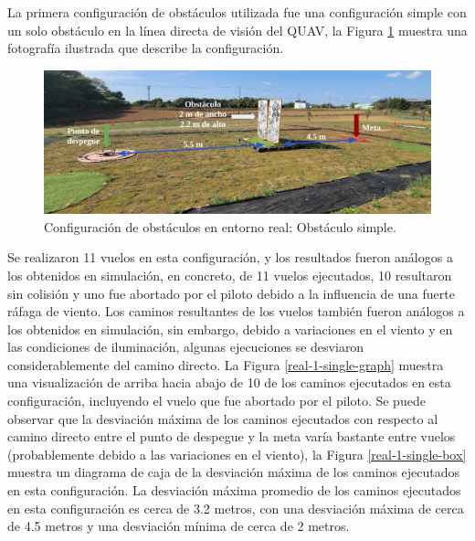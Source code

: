 La primera configuración de obstáculos utilizada fue una configuración simple con un solo obstáculo en la línea directa de visión del QUAV, la Figura \ref{real-1-single-0-setup} muestra una fotografía ilustrada que describe la configuración.

\begin{figure}[H]
    \centering
    \includegraphics[scale=0.22]{partes/img/real-1-single-0-setup.png}
    \caption[Configuración de obstáculos en entorno real: Obstáculo simple]{Configuración de obstáculos en entorno real: Obstáculo simple.}
    \label{real-1-single-0-setup}
\end{figure}

Se realizaron 11 vuelos en esta configuración, y los resultados fueron análogos a los obtenidos en simulación, en concreto, de 11 vuelos ejecutados, 10 resultaron sin colisión y uno fue abortado por el piloto debido a la influencia de una fuerte ráfaga de viento. Los caminos resultantes de los vuelos también fueron análogos a los obtenidos en simulación, sin embargo, debido a variaciones en el viento y en las condiciones de iluminación, algunas ejecuciones se desviaron considerablemente del camino directo. La Figura \ref{real-1-single-graph} muestra una visualización de arriba hacia abajo de 10 de los caminos ejecutados en esta configuración, incluyendo el vuelo que fue abortado por el piloto. Se puede observar que la desviación máxima de los caminos ejecutados con respecto al camino directo entre el punto de despegue y la meta varía bastante entre vuelos (probablemente debido a las variaciones en el viento), la Figura \ref{real-1-single-box} muestra un diagrama de caja de la desviación máxima de los caminos ejecutados en esta configuración. La desviación máxima promedio de los caminos ejecutados en esta configuración es cerca de 3.2 metros, con una desviación máxima de cerca de 4.5 metros y una desviación mínima de cerca de 2 metros.

